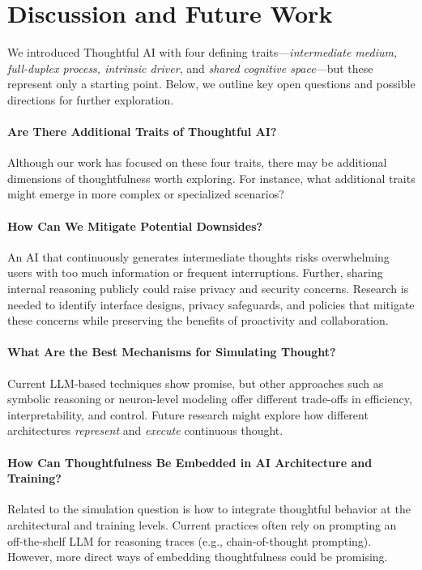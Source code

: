 \section{Discussion and Future Work} 
We introduced Thoughtful AI with four defining traits---\emph{intermediate medium, full-duplex process, intrinsic driver}, and \emph{shared cognitive space}---but these represent only a starting point. Below, we outline key open questions and possible directions for further exploration.

\paragraph{Are There Additional Traits of Thoughtful AI?}
Although our work has focused on these four traits, there may be additional dimensions of thoughtfulness worth exploring. For instance, what additional traits might emerge in more complex or specialized scenarios?

\paragraph{How Can We Mitigate Potential Downsides?}
An AI that continuously generates intermediate thoughts risks overwhelming users with too much information or frequent interruptions. Further, sharing internal reasoning publicly could raise privacy and security concerns. Research is needed to identify interface designs, privacy safeguards, and policies that mitigate these concerns while preserving the benefits of proactivity and collaboration.

\paragraph{What Are the Best Mechanisms for Simulating Thought?}
Current LLM-based techniques show promise, but other approaches such as symbolic reasoning or neuron-level modeling offer different trade-offs in efficiency, interpretability, and control. Future research might explore how different architectures \emph{represent} and \emph{execute} continuous thought.

\paragraph{How Can Thoughtfulness Be Embedded in AI Architecture and Training?}
Related to the simulation question is how to integrate thoughtful behavior at the architectural and training levels. Current practices often rely on prompting an off-the-shelf LLM for reasoning traces (e.g., chain-of-thought prompting). However, more direct ways of embedding thoughtfulness could be promising.


